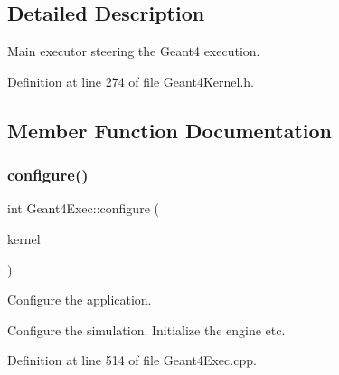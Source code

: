 \subsection{Detailed Description}
Main executor steering the Geant4 execution. 

Definition at line 274 of file Geant4\+Kernel.\+h.



\subsection{Member Function Documentation}
\hypertarget{class_d_d4hep_1_1_simulation_1_1_geant4_exec_a68d70832e5acb1c074ce12cae898af09}{}\label{class_d_d4hep_1_1_simulation_1_1_geant4_exec_a68d70832e5acb1c074ce12cae898af09} 
\subsubsection{\texorpdfstring{configure()}{configure()}}
{\footnotesize\ttfamily int Geant4\+Exec\+::configure (\begin{DoxyParamCaption}\item[{\hyperlink{class_d_d4hep_1_1_simulation_1_1_geant4_kernel}{Geant4\+Kernel} \&}]{kernel }\end{DoxyParamCaption})\hspace{0.3cm}{\ttfamily [static]}}



Configure the application. 

Configure the simulation. Initialize the engine etc. 

Definition at line 514 of file Geant4\+Exec.\+cpp.



